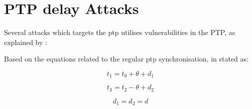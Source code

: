 \begin{figure}
\end{figure}  



\section{PTP delay Attacks} \label{sec:PTP-delay}
Several attacks which targets the \acrlong{ptp}  utilises vulnerabilities in the PTP, as explained by \cite{finkenzeller2022feasible}:


Based on the equations related to the regular \acrshort{ptp} synchronisation, in \cite{finkenzeller2022feasible} stated as:



\begin{equation} \label{eq:5-t1}
t_1 = t_0 + \theta + d_1 
\end{equation}

\begin{equation} \label{eq:5-t3}
t_3 = t_2 - \theta + d_2 
\end{equation}

\begin{equation}   \label{eq:5-d1}
d_1 = d_2 = d  
\end{equation}


